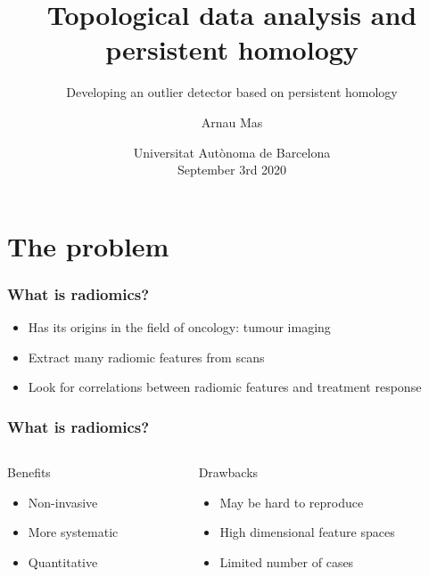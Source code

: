\documentclass[xcolor=dvipsnames]{beamer}
\title[TDA and persistent homology]{\bfseries{Topological data analysis and persistent
homology}}
\subtitle{Developing an outlier detector based on persistent homology}
\author[Arnau Mas]{Arnau Mas}
\institute[]{\footnotesize{\itshape{Supervised by}} \\ Dr Albert Ruiz}
\date[UAB, Sept 9th 2020]{\small Universitat Autònoma de Barcelona \\ September 3rd 2020}
\begin{document}
\begin{frame}[plain]
	\titlepage
\end{frame}


\AtEndDocument{
	\begin{frame}[plain]
		\titlepage
	\end{frame}
}

\section{The problem}

\begin{frame}
	\frametitle{What is radiomics?}
	\begin{itemize}
		\item Has its origins in the field of oncology: tumour imaging \pause
		\item Extract many \alert{radiomic features} from scans \pause
		\item Look for correlations between radiomic features and treatment response
	\end{itemize}
\end{frame}

\begin{frame}
	\frametitle{What is radiomics?}
	\begin{columns}
		\begin{column}{0.4\textwidth}
			\begin{block}{Benefits}
				\begin{itemize}
					\item Non-invasive
					\item More systematic
					\item Quantitative
				\end{itemize} \pause
			\end{block}		
		\end{column}
		
		\begin{column}{0.4\textwidth}
			\begin{block}{Drawbacks}
				\begin{itemize}
					\item May be hard to reproduce
					\item High dimensional feature spaces
					\item Limited number of cases
				\end{itemize} 
			\end{block}				
		\end{column}
	\end{columns}
\end{frame}
\end{document}
